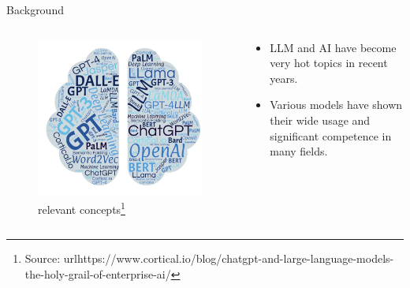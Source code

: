 \documentclass[t]{beamer}
\begin{document}
\begin{frame}{Background}
  \begin{columns}
    \begin{column}{0.4\textwidth}
        \begin{figure}
            \centering
            \includegraphics[width=\textwidth]{llm1.png}
            \caption{relevant concepts\footnote{Source: url{https://www.cortical.io/blog/chatgpt-and-large-language-models-the-holy-grail-of-enterprise-ai/}}}
            \label{fig:llm1}
        \end{figure}
    \end{column}
    \begin{column}{0.5\textwidth}
        \begin{itemize}
            \item LLM and AI have become very hot topics in recent years.
            \item Various models have shown their wide usage and significant competence in many fields.
        \end{itemize}
    \end{column}
\end{columns}
\end{frame}
\end{document}
